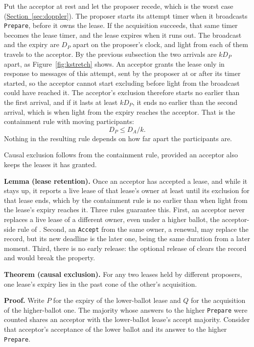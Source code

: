 \documentclass[final,5p,times,twocolumn,number]{elsarticle}
\newcommand{\code}[1]{\texttt{#1}}
\newcommand{\secref}[1]{\hyperref[#1]{Section~\ref*{#1}}}
\newcommand{\figref}[1]{Figure~\ref*{#1}}
\begin{document}
Put the acceptor at rest and let the proposer recede, which is the worst case (\secref{sec:doppler}).  The proposer starts its attempt timer when it broadcasts \code{Prepare}, before it owns the lease.  If the acquisition succeeds, that same timer becomes the lease timer, and the lease expires when it runs out.  The broadcast and the expiry are $D_P$ apart on the proposer's clock, and light from each of them travels to the acceptor.  By the previous subsection the two arrivals are $kD_P$ apart, as \figref{fig:kstretch} shows.  An acceptor grants the lease only in response to messages of this attempt, sent by the proposer at or after its timer started, so the acceptor cannot start excluding before light from the broadcast could have reached it.  The acceptor's exclusion therefore starts no earlier than the first arrival, and if it lasts at least $kD_P$, it ends no earlier than the second arrival, which is when light from the expiry reaches the acceptor.  That is the containment rule with moving participants:
\[
  D_P \leq D_A / k .
\]
Nothing in the resulting rule depends on how far apart the participants are.

Causal exclusion follows from the containment rule, provided an acceptor also keeps the leases it has granted.

\textbf{Lemma (lease retention).}  Once an acceptor has accepted a lease, and while it stays up, it reports a live lease of that lease's owner at least until its exclusion for that lease ends, which by the containment rule is no earlier than when light from the lease's expiry reaches it.  Three rules guarantee this.  First, an acceptor never replaces a live lease of a different owner, even under a higher ballot, the acceptor-side rule of \cite{ref2}.  Second, an \code{Accept} from the same owner, a renewal, may replace the record, but its new deadline is the later one, being the same duration from a later moment.  Third, there is no early release: the optional release of \cite{ref2} clears the record and would break the property.

\textbf{Theorem (causal exclusion).}  For any two leases held by different proposers, one lease's expiry lies in the past cone of the other's acquisition.

\textbf{Proof.}  Write $P$ for the expiry of the lower-ballot lease and $Q$ for the acquisition of the higher-ballot one.  The majority whose answers to the higher \code{Prepare} were counted shares an acceptor with the lower-ballot lease's accept majority.  Consider that acceptor's acceptance of the lower ballot and its answer to the higher \code{Prepare}.
\end{document}
